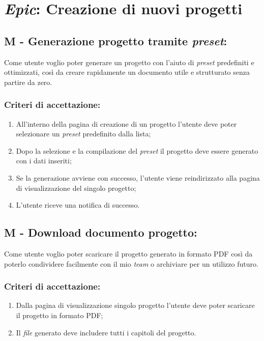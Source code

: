 \section*{\textit{Epic}: Creazione di nuovi progetti}

\subsection*{M - Generazione progetto tramite \textit{preset}:}

\noindent Come utente voglio poter generare un progetto con l'aiuto di \textit{preset} predefiniti e ottimizzati, così da creare rapidamente un documento utile e strutturato senza partire da zero.

\subsubsection*{Criteri di accettazione:}

\begin{enumerate}
    \item All’interno della pagina di creazione di un progetto l'utente deve poter selezionare un \textit{preset} predefinito dalla lista;
    \item Dopo la selezione e la compilazione del \textit{preset} il progetto deve essere generato con i dati inseriti;
    \item Se la generazione avviene con successo, l’utente viene reindirizzato alla pagina di visualizzazione del singolo progetto;
    \item L’utente riceve una notifica di successo.
\end{enumerate}

\vspace{0.5cm}

\subsection*{M - Download documento progetto:}

\noindent Come utente voglio poter scaricare il progetto generato in formato PDF così da poterlo condividere facilmente con il mio \textit{team} o archiviare per un utilizzo futuro.

\subsubsection*{Criteri di accettazione:}

\begin{enumerate}
    \item Dalla pagina di visualizzazione singolo progetto l'utente deve poter scaricare il progetto in formato PDF;
    \item Il \textit{file} generato deve includere tutti i capitoli del progetto.
\end{enumerate}

